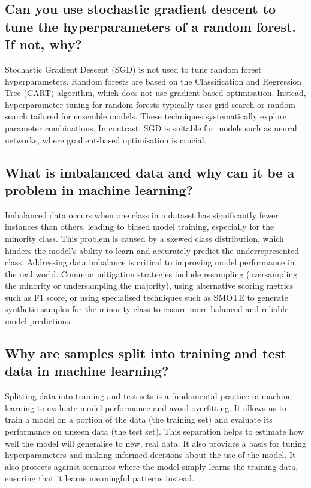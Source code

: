 \documentclass{article}
\begin{document}
\subsection{Can you use stochastic gradient descent to tune the hyperparameters of a random forest. If not, why?}

Stochastic Gradient Descent (SGD) is not used to tune random forest hyperparameters.
Random forests are based on the Classification and Regression Tree (CART) algorithm, which does not use gradient-based optimisation.
Instead, hyperparameter tuning for random forests typically uses grid search or random search tailored for ensemble models.
These techniques systematically explore parameter combinations.
In contrast, SGD is suitable for models such as neural networks, where gradient-based optimisation is crucial.


\subsection{What is imbalanced data and why can it be a problem in machine learning?}

Imbalanced data occurs when one class in a dataset has significantly fewer instances than others, leading to biased model training, especially for the minority class.
This problem is caused by a skewed class distribution, which hinders the model's ability to learn and accurately predict the underrepresented class.
Addressing data imbalance is critical to improving model performance in the real world.
Common mitigation strategies include resampling (oversampling the minority or undersampling the majority), using alternative scoring metrics such as F1 score, or using specialised techniques such as SMOTE to generate synthetic samples for the minority class to ensure more balanced and reliable model predictions.


\subsection{Why are samples split into training and test data in machine learning?}

Splitting data into training and test sets is a fundamental practice in machine learning to evaluate model performance and avoid overfitting.
It allows us to train a model on a portion of the data (the training set) and evaluate its performance on unseen data (the test set).
This separation helps to estimate how well the model will generalise to new, real data.
It also provides a basis for tuning hyperparameters and making informed decisions about the use of the model.
It also protects against scenarios where the model simply learns the training data, ensuring that it learns meaningful patterns instead.
\end{document}
